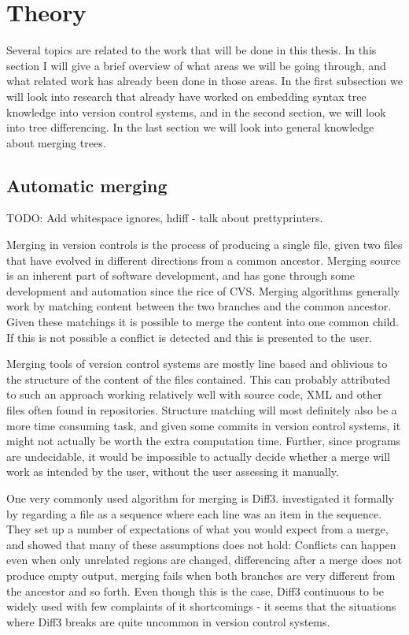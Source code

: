 \documentclass[12pt]{article}
\begin{document}
\maketitle

\section{Theory}
Several topics are related to the work that will be done in this thesis. In this section I will give a brief overview of what areas we will be going through, and what related work has already been done in those areas. In the first subsection we will look into research that already have worked on embedding syntax tree knowledge into version control systems, and in the second section, we will look into tree differencing. In the last section we will look into general knowledge about merging trees.

\subsection{Automatic merging}
TODO: Add whitespace ignores, hdiff - talk about prettyprinters.

Merging in version controls is the process of producing a single file, given two files that have evolved in different directions from a common ancestor. Merging source is an inherent part of software development, and has gone through some development and automation since the rice of CVS. Merging algorithms generally work by matching content between the two branches and the common ancestor. Given these matchings it is possible to merge the content into one common child. If this is not possible a conflict is detected and this is presented to the user.

Merging tools of version control systems are mostly line based and oblivious to the structure of the content of the files contained. This can probably attributed to such an approach working relatively well with source code, XML and other files often found in repositories. Structure matching will most definitely also be a more time consuming task, and given some commits in version control systems, it might not actually be worth the extra computation time. Further, since programs are undecidable, it would be impossible to actually decide whether a merge will work as intended by the user, without the user assessing it manually.

One very commonly used algorithm for merging is Diff3. \citet{Khanna} investigated it formally by regarding a file as a sequence where each line was an item in the sequence. They set up a number of expectations of what you would expect from a merge, and showed that many of these assumptions does not hold: Conflicts can happen even when only unrelated regions are changed, differencing after a merge does not produce empty output, merging fails when both branches are very different from the ancestor and so forth. Even though this is the case, Diff3 continuous to be widely used with few complaints of it shortcomings - it seems that the situations where Diff3 breaks are quite uncommon in version control systems.
\end{document}
